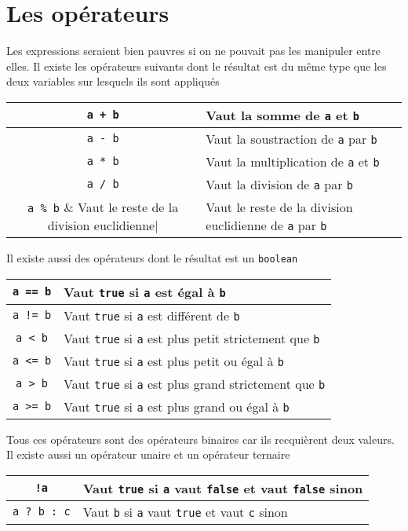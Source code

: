 \section{Les opérateurs}
Les expressions seraient bien pauvres si on ne pouvait pas les manipuler
entre elles.
Il existe les opérateurs suivants dont le résultat est du même type
que les deux variables sur lesquels ils sont appliqués
\begin{center}
  \begin{tabular}{|c|l|}
    \hline
    \verb|a + b| & Vaut la somme de \verb|a| et \verb|b|\\
    \hline
    \verb|a - b| & Vaut la soustraction de \verb|a| par \verb|b|\\
    \hline
    \verb|a * b| & Vaut la multiplication de \verb|a| et \verb|b|\\
    \hline
    \verb|a / b| & Vaut la division de \verb|a| par \verb|b|\\
    \hline
    \verb|a % b| & Vaut le reste de la division euclidienne
    de \verb|a| par \verb|b|\\
    \hline
  \end{tabular}
\end{center}
Il existe aussi des opérateurs dont le résultat est un \verb|boolean|
\begin{center}
  \begin{tabular}{|c|l|}
    \hline
    \verb|a == b| & Vaut \verb|true| si \verb|a| est égal à \verb|b|\\
    \hline
    \verb|a != b| & Vaut \verb|true| si \verb|a| est différent de \verb|b|\\
    \hline
    \verb|a < b| & Vaut \verb|true| si \verb|a| est plus petit
    strictement que \verb|b|\\
    \hline
    \verb|a <= b| & Vaut \verb|true| si \verb|a| est plus petit
    ou égal à \verb|b|\\
    \hline
    \verb|a > b| & Vaut \verb|true| si \verb|a| est plus grand
    strictement que \verb|b|\\
    \hline
    \verb|a >= b| & Vaut \verb|true| si \verb|a| est plus grand
    ou égal à \verb|b|\\
    \hline
  \end{tabular}
\end{center}

Tous ces opérateurs sont des opérateurs binaires car ils recquièrent deux
valeurs.
Il existe aussi un opérateur unaire et un opérateur ternaire
\begin{center}
  \begin{tabular}{|c|l|}
    \hline
    \verb|!a| & Vaut \verb|true| si \verb|a| vaut \verb|false| et
    vaut \verb|false| sinon\\
    \hline
    \verb|a ? b : c| & Vaut \verb|b| si \verb|a| vaut \verb|true| et
    vaut \verb|c| sinon\\
    \hline
  \end{tabular}
\end{center}

